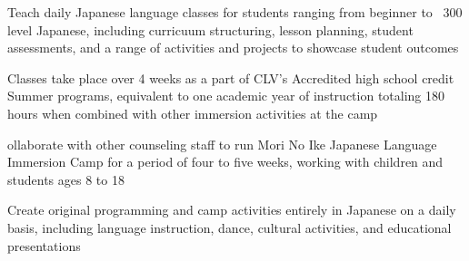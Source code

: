 \documentclass[letterpaper]{deedy-resume_sm} %
\begin{document}
\begin{tightitemize}
\item Teach daily Japanese language classes for students ranging from beginner to ~300 level Japanese, including curricuum structuring, lesson planning, student assessments, and a range of activities and projects to showcase student outcomes
\item Classes take place over 4 weeks as a part of CLV's Accredited high school credit Summer programs, equivalent to one academic year of instruction totaling 180 hours when combined with other immersion activities at the camp
\end{tightitemize}
\begin{tightitemize}
\item ollaborate with other counseling staff to run Mori No Ike Japanese Language Immersion Camp for a period of four to five weeks, working with children and students ages 8 to 18
\item Create original programming and camp activities entirely in Japanese on a daily basis, including language instruction, dance, cultural activities, and educational presentations
\end{tightitemize}
\end{document}
